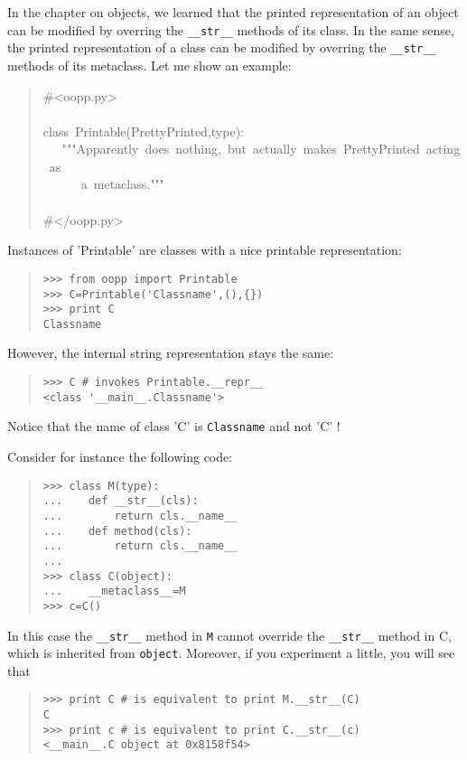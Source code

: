 \documentclass[10pt,english]{article}
\begin{document}
In the chapter on objects, we learned that the printed representation of
an object can be modified by overring the \texttt{{\_}{\_}str{\_}{\_}} methods of its
class. In the same sense, the printed representation of a class can be 
modified by overring the \texttt{{\_}{\_}str{\_}{\_}} methods of its metaclass. Let me show an 
example:
\begin{quote}
\begin{ttfamily}\begin{flushleft}
\mbox{{\#}<oopp.py>}\\
\mbox{}\\
\mbox{class~Printable(PrettyPrinted,type):}\\
\mbox{~~~"""Apparently~does~nothing,~but~actually~makes~PrettyPrinted~acting~as}\\
\mbox{~~~~~~a~metaclass."""}\\
\mbox{}\\
\mbox{{\#}</oopp.py>}
\end{flushleft}\end{ttfamily}
\end{quote}

Instances of 'Printable' are classes with a nice printable representation:
\begin{quote}
\begin{verbatim}>>> from oopp import Printable 
>>> C=Printable('Classname',(),{})
>>> print C
Classname\end{verbatim}
\end{quote}

However, the internal string representation stays the same:
\begin{quote}
\begin{verbatim}>>> C # invokes Printable.__repr__
<class '__main__.Classname'>\end{verbatim}
\end{quote}

Notice that the name of class 'C' is \texttt{Classname} and not 'C' !

Consider for instance the following code:
\begin{quote}
\begin{verbatim}>>> class M(type):
...    def __str__(cls):
...        return cls.__name__
...    def method(cls):
...        return cls.__name__
...
>>> class C(object):
...    __metaclass__=M
>>> c=C()\end{verbatim}
\end{quote}

In this case the \texttt{{\_}{\_}str{\_}{\_}} method in \texttt{M} cannot override the 
\texttt{{\_}{\_}str{\_}{\_}} method in C, which is inherited from \texttt{object}.
Moreover, if you experiment a little, you will see that
\begin{quote}
\begin{verbatim}>>> print C # is equivalent to print M.__str__(C)
C
>>> print c # is equivalent to print C.__str__(c)
<__main__.C object at 0x8158f54>\end{verbatim}
\end{quote}
\end{document}
